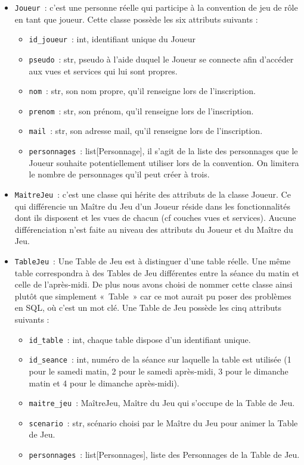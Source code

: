 \documentclass[11pt]{article}
\begin{document}
\begin{itemize}
    \item \texttt{Joueur}~: c'est une personne réelle qui participe à la convention de jeu de rôle en tant que joueur. Cette classe possède les six attributs suivants :
    \begin{itemize}[label=, font=\small]
        \item \texttt{id\_joueur}~: int, identifiant unique du Joueur
        \item \texttt{pseudo}~: str, pseudo à l'aide duquel le Joueur se connecte afin d'accéder aux vues et services qui lui sont propres.
        \item \texttt{nom}~: str, son nom propre, qu'il renseigne lors de l'inscription.
        \item \texttt{prenom}~: str, son prénom, qu'il renseigne lors de l'inscription.
        \item \texttt{mail}~: str, son adresse mail, qu'il renseigne lors de l'inscription.
        \item \texttt{personnages}~: list[Personnage], il s'agit de la liste des personnages que le Joueur souhaite potentiellement utiliser lors de la convention. On limitera le nombre de personnages qu'il peut créer à trois.
    \end{itemize}

    \item \texttt{MaitreJeu}~: c'est une classe qui hérite des attributs de la classe Joueur. Ce qui différencie un Maître du Jeu d'un Joueur réside dans les fonctionnalités dont ils disposent et les vues de chacun (cf couches vues et services). Aucune différenciation n'est faite au niveau des attributs du Joueur et du Maître du Jeu.


    \item \texttt{TableJeu}~: Une Table de Jeu est à distinguer d'une table réelle. Une même table correspondra à des Tables de Jeu différentes entre la séance du matin et celle de l'après-midi. De plus nous avons choisi de nommer cette classe ainsi plutôt que simplement «~Table~» car ce mot aurait pu poser des problèmes en SQL, où c'est un mot clé. Une Table de Jeu possède les cinq attributs suivants :
    \begin{itemize}[label=, font=\small]
        \item \texttt{id\_table}~: int, chaque table dispose d'un  identifiant unique.
        \item \texttt{id\_seance}~: int, numéro de la séance sur laquelle la table est utilisée (1 pour le samedi matin, 2 pour le samedi après-midi, 3 pour le dimanche matin et 4 pour le dimanche après-midi).
        \item \texttt{maitre\_jeu}~: MaîtreJeu, Maître du Jeu qui s'occupe de la Table de Jeu.
        \item \texttt{scenario}~: str, scénario choisi par le Maître du Jeu pour animer la Table de Jeu.
        \item \texttt{personnages}~: list[Personnages], liste des Personnages de la Table de Jeu.
    \end{itemize}


\end{itemize}
\end{document}
